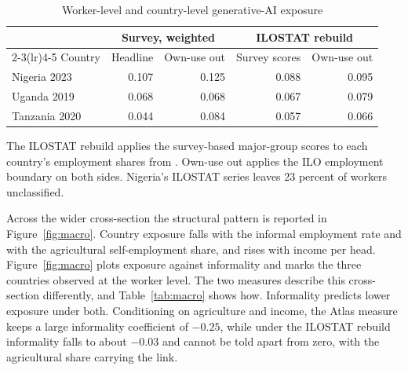 \begin{table}[ht]
\centering
\caption{Worker-level and country-level generative-AI exposure}
\label{tab:country}
\small
\begin{tabular}{lrrrr}
\toprule
 & \multicolumn{2}{c}{Survey, weighted} & \multicolumn{2}{c}{ILOSTAT rebuild} \\
\cmidrule(lr){2-3}\cmidrule(lr){4-5}
Country & Headline & Own-use out & Survey scores & Own-use out \\
\midrule
Nigeria 2023   & 0.107 & 0.125 & 0.088 & 0.095 \\
Uganda 2019    & 0.068 & 0.068 & 0.067 & 0.079 \\
Tanzania 2020  & 0.044 & 0.084 & 0.057 & 0.066 \\
\bottomrule
\end{tabular}

\vspace{4pt}
\begin{minipage}{0.9\linewidth}
\footnotesize
The ILOSTAT rebuild applies the survey-based major-group scores to each
country's employment shares from \citet{ilostat}. Own-use out applies the ILO
employment boundary \citep{icls2013} on both sides. Nigeria's ILOSTAT series
leaves 23 percent of workers unclassified.
\end{minipage}
\end{table}

Across the wider cross-section the structural pattern is reported 
in Figure~\ref{fig:macro}. 
Country exposure falls with the informal employment rate and with the
agricultural self-employment share, and rises with income per head.
Figure~\ref{fig:macro} plots exposure against informality and marks the three
countries observed at the worker level.
The two measures describe this cross-section differently, and
Table~\ref{tab:macro} shows how. Informality
predicts lower exposure under both. Conditioning on agriculture and income, the
Atlas measure keeps a large informality coefficient of $-0.25$, while under the
ILOSTAT rebuild informality falls to about $-0.03$ and cannot be told apart from
zero, with the agricultural share carrying the link.

